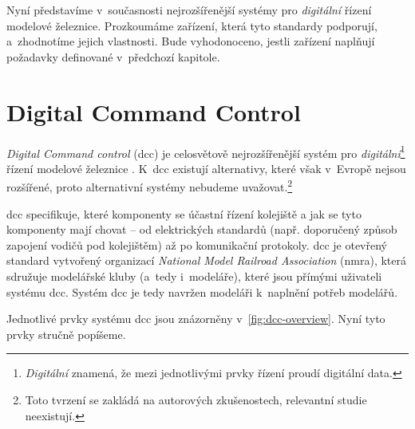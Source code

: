 Nyní představíme v~současnosti nejrozšířenější systémy pro \textit{digitální}
řízení modelové železnice. Prozkoumáme zařízení, která tyto standardy
podporují, a~zhodnotíme jejich vlastnosti. Bude vyhodonoceno, jestli zařízení
naplňují požadavky definované v~předchozí kapitole.

\section{Digital Command Control} \label{sec:dcc}

\textit{Digital Command control} (\gls{dcc}) je celosvětově nejrozšířenější
systém pro \textit{digitální}\footnote{\textit{Digitální} znamená, že mezi
jednotlivými prvky řízení proudí digitální data.} řízení modelové železnice
\cite{dcc_systems:web}. K~\gls{dcc} existují alternativy, které však v~Evropě
nejsou rozšířené, proto alternativní systémy nebudeme uvažovat.\footnote{Toto
tvrzení se zakládá na autorových zkušenostech, relevantní studie neexistují.}

\gls{dcc} specifikuje, které komponenty se účastní řízení kolejiště a jak se
tyto komponenty mají chovat – od elektrických standardů (např. doporučený
způsob zapojení vodičů pod kolejištěm) až po komunikační protokoly. \gls{dcc}
je otevřený standard vytvořený organizací \textit{National Model Railroad
Association} (\gls{nmra}), která sdružuje modelářské kluby (a~tedy i~modeláře),
které jsou přímými uživateli systému \gls{dcc}. Systém \gls{dcc} je tedy
navržen modeláři k~naplnění potřeb modelářů.

Jednotlivé prvky systému \gls{dcc} jsou znázorněny v~\ref{fig:dcc-overview}.
Nyní tyto prvky stručně popíšeme.

